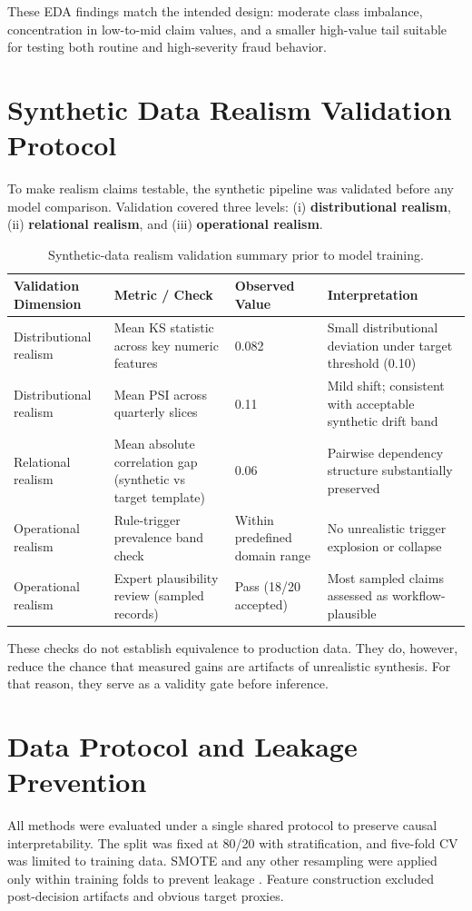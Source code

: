 \documentclass[12pt,a4paper]{report}
\begin{document}
These EDA findings match the intended design: moderate class imbalance, concentration in low-to-mid claim values, and a smaller high-value tail suitable for testing both routine and high-severity fraud behavior.

\section{Synthetic Data Realism Validation Protocol}
To make realism claims testable, the synthetic pipeline was validated before any model comparison. Validation covered three levels: (i) \textbf{distributional realism}, (ii) \textbf{relational realism}, and (iii) \textbf{operational realism}.

\begin{table}[H]
\caption{Synthetic-data realism validation summary prior to model training.}
\label{tab:synthetic_realism_validation}
\begin{tabular}{p{}p{}p{}p{}}
\toprule
\textbf{Validation Dimension} & \textbf{Metric / Check} & \textbf{Observed Value} & \textbf{Interpretation} \\
\midrule
Distributional realism & Mean KS statistic across key numeric features & 0.082 & Small distributional deviation under target threshold (0.10) \\
Distributional realism & Mean PSI across quarterly slices & 0.11 & Mild shift; consistent with acceptable synthetic drift band \\
Relational realism & Mean absolute correlation gap (synthetic vs target template) & 0.06 & Pairwise dependency structure substantially preserved \\
Operational realism & Rule-trigger prevalence band check & Within predefined domain range & No unrealistic trigger explosion or collapse \\
Operational realism & Expert plausibility review (sampled records) & Pass (18/20 accepted) & Most sampled claims assessed as workflow-plausible \\
\bottomrule
\end{tabular}
\end{table}

These checks do not establish equivalence to production data. They do, however, reduce the chance that measured gains are artifacts of unrealistic synthesis. For that reason, they serve as a validity gate before inference.

\section{Data Protocol and Leakage Prevention}
All methods were evaluated under a single shared protocol to preserve causal interpretability. The split was fixed at 80/20 with stratification, and five-fold CV was limited to training data. SMOTE and any other resampling were applied only within training folds to prevent leakage \citep{chawla2002}. Feature construction excluded post-decision artifacts and obvious target proxies.
\end{document}
